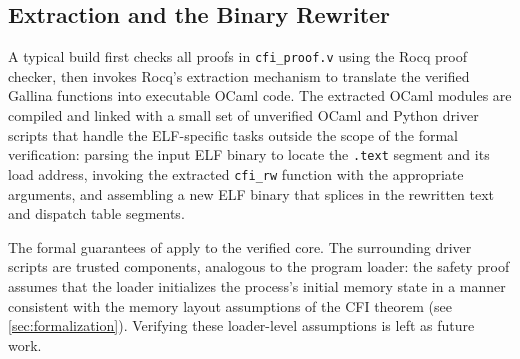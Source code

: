 \subsection{Extraction and the Binary Rewriter}

A typical \pname build first checks all proofs in \texttt{cfi\_proof.v} using the Rocq proof checker, then invokes Rocq's extraction mechanism to translate the verified Gallina functions into executable OCaml code.
The extracted OCaml modules are compiled and linked with a small set of unverified OCaml and Python driver scripts that handle the ELF-specific tasks outside the scope of the formal verification:
parsing the input ELF binary to locate the \texttt{.text} segment and its load address,
invoking the extracted \texttt{cfi\_rw} function with the appropriate arguments,
and assembling a new ELF binary that splices in the rewritten text and dispatch table segments.

The formal guarantees of \pname apply to the verified core.
The surrounding driver scripts are trusted components, analogous to the program loader:
the safety proof assumes that the loader initializes the process's initial memory state in a manner consistent with the memory layout assumptions of the CFI theorem (see \autoref{sec:formalization}).
Verifying these loader-level assumptions is left as future work.
